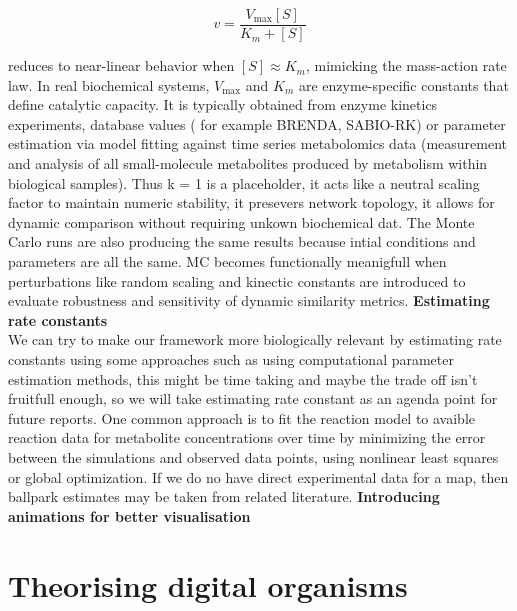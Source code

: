 \documentclass[12pt,a4paper]{article}
\begin{document}
\[
v = \frac{V_{\text{max}} [S]}{K_m + [S]}
\]

reduces to near-linear behavior when \( [S] \approx K_m \), mimicking the mass-action rate law.
In real biochemical systems, \( V_{\text{max}} \) and \( K_m \) are enzyme-specific constants that define catalytic capacity. It is typically obtained from enzyme kinetics experiments, database values ( for example BRENDA, SABIO-RK) or parameter estimation via model fitting against time series metabolomics data (measurement and analysis of all small-molecule metabolites produced by metabolism within biological samples).
Thus k = 1 is a placeholder, it acts like a neutral scaling factor to maintain numeric stability, it presevers network topology, it allows for dynamic comparison without requiring unkown biochemical dat.
The Monte Carlo runs are also producing the same results because intial conditions and parameters are all the same. MC becomes functionally meanigfull when perturbations like random scaling and kinectic constants are introduced to evaluate robustness and sensitivity of dynamic similarity metrics.
\textbf{Estimating rate constants} \\
We can try to make our framework more biologically relevant by estimating rate constants using some approaches such as using computational parameter estimation methods, this might be time taking and maybe the trade off isn't fruitfull enough, so we will take estimating rate constant as an agenda point for future reports.
One common approach is to fit the reaction model to avaible reaction data for metabolite concentrations over time by minimizing the error between the simulations and observed data points, using nonlinear least squares or global optimization. If we do no have direct experimental data for a map, then ballpark estimates may be taken from related literature.
\textbf{Introducing animations for better visualisation} \\

\section*{Theorising digital organisms}


\vfill
{}
\end{document}
